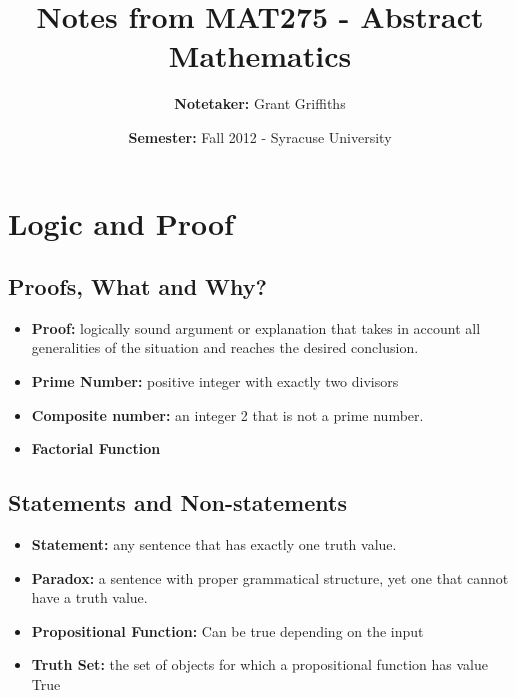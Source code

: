 \documentclass{report}
\title{\textbf{Notes from MAT275 - Abstract Mathematics}}
\author{\textbf{Notetaker: }Grant Griffiths}
\date{\textbf{Semester: }Fall 2012 - Syracuse University}
\begin{document}
   \maketitle
   \tableofcontents 

\chapter{Logic and Proof}
	\section{Proofs, What and Why?}
		\begin{itemize}\addtolength{\leftskip}{2em}
			\item \textbf{Proof:} logically sound argument or explanation that takes in account all generalities of the situation and reaches the desired conclusion.
			\item \textbf{Prime Number:} positive integer with exactly two divisors 
			\item \textbf{Composite number:} an integer 2 that is not a prime number.
			\item \textbf{Factorial Function}
		\end{itemize}
	\section{Statements and Non-statements}
		\begin{itemize}\addtolength{\leftskip}{2em}
			\item \textbf{Statement:} any sentence that has exactly one truth value.
			\item \textbf{Paradox:} a sentence with proper grammatical structure, yet one that cannot have a truth value.
			\item \textbf{Propositional Function:} Can be true depending on the input
			\item \textbf{Truth Set:} the set of objects for which a propositional function has value True
		\end{itemize}
\end{document}
